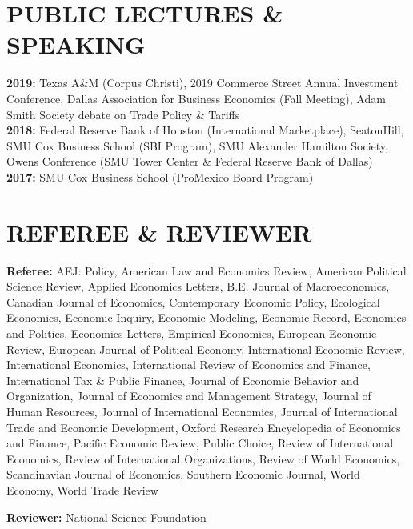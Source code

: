 \documentclass[11pt]{res}
\begin{document}
\begin{resume}
\section{PUBLIC LECTURES \& SPEAKING}\vspace{1.5mm}
{\bf 2019:} Texas A\&M (Corpus Christi), 2019 Commerce Street Annual Investment Conference, Dallas Association for Business Economics (Fall Meeting), Adam Smith Society debate on Trade Policy \& Tariffs\vspace{1.5mm}\\
{\bf 2018:} Federal Reserve Bank of Houston (International Marketplace), SeatonHill, SMU Cox Business School (SBI Program), SMU Alexander Hamilton Society, Owens Conference (SMU Tower Center \& Federal Reserve Bank of Dallas)\vspace{1.5mm}\\
{\bf 2017:} SMU Cox Business School (ProMexico Board Program)

\section{REFEREE \& REVIEWER} \vspace{1.5mm}
{\bf Referee:} AEJ: Policy, American Law and Economics Review, American Political Science Review, Applied Economics Letters, B.E. Journal of Macroeconomics, Canadian Journal of Economics, Contemporary Economic Policy, Ecological Economics, Economic Inquiry, Economic Modeling, Economic Record, Economics and Politics, Economics Letters, Empirical Economics, European Economic Review, European Journal of Political Economy, International Economic Review, International Economics, International Review of Economics and Finance, International Tax \& Public Finance, Journal of Economic Behavior and Organization, Journal of Economics and Management Strategy, Journal of Human Resources, Journal of International Economics, Journal of International Trade and Economic Development, Oxford Research Encyclopedia of Economics and Finance, Pacific Economic Review, Public Choice, Review of International Economics, Review of International Organizations, Review of World Economics, Scandinavian Journal of Economics, Southern Economic Journal, World Economy, World Trade Review

{\bf Reviewer:} National Science Foundation


\end{resume}
\end{document}
